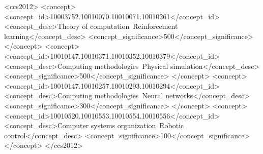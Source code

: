 \documentclass{sig-alternate-05-2015}
\begin{document}
\maketitle
\begin{abstract}
In this work we focus on the role of Multibody Simulation in creating Reinforcement Learning virtual environments for robotic manipulation, showing a versatile, efficient and open source toolchain to create directly from CAD models.
Using the Chrono::Solidworks plugin we are able to create robotic environments in the 3D CAD software Solidworks\textregistered and later convert them into PyChrono models (PyChrono is an open source Python module for multibody simulation).
In addition, we demonstrate how collision detection can be made more efficient by introducing a limited number of contact primitives instead of performing collision detection and evaluation on complex 3D meshes, still reaching a policy able to avoid unwanted collisions.
We tested this approach on a 6DOF robot Comau Racer3: the robot, together with a 2 fingers gripper (Hand-E by Robotiq) was modelled using Solidworks\textregistered, imported as a PyChrono model and then a NN was trained in simulation to control its motor torques to reach a target position.
To demonstrate the versatility of this toolchain we also repeated the same procedure to model and then train the ABB IRB 120 robotic arm.

\end{abstract}


%
%
\begin{CCSXML}
<ccs2012>
<concept>
<concept_id>10003752.10010070.10010071.10010261</concept_id>
<concept_desc>Theory of computation~Reinforcement learning</concept_desc>
<concept_significance>500</concept_significance>
</concept>
<concept>
<concept_id>10010147.10010371.10010352.10010379</concept_id>
<concept_desc>Computing methodologies~Physical simulation</concept_desc>
<concept_significance>500</concept_significance>
</concept>
<concept>
<concept_id>10010147.10010257.10010293.10010294</concept_id>
<concept_desc>Computing methodologies~Neural networks</concept_desc>
<concept_significance>300</concept_significance>
</concept>
<concept>
<concept_id>10010520.10010553.10010554.10010556</concept_id>
<concept_desc>Computer systems organization~Robotic control</concept_desc>
<concept_significance>100</concept_significance>
</concept>
</ccs2012>
\end{CCSXML}
\end{document}
